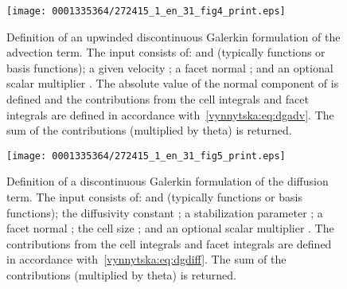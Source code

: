 \begin{figure}[!t]
\texttt{[image: 0001335364/272415\_1\_en\_31\_fig4\_print.eps]}
  \caption{Definition of an upwinded discontinuous Galerkin
    formulation of the advection term. The input consists of:
     and  (typically functions or basis
    functions); a given velocity ; a facet normal ;
    and an optional scalar multiplier . The absolute
    value of the normal component of  is defined and the
    contributions from the cell integrals and facet integrals are
    defined in accordance with~\eqref{vynnytska:eq:dgadv}. The sum
    of the contributions (multiplied by theta) is returned.}
  \label{vynnytska:fig:advection}\vspace*{10pt}
\end{figure}
%
\begin{figure}[!t]
\texttt{[image: 0001335364/272415\_1\_en\_31\_fig5\_print.eps]}
  \caption{Definition of a discontinuous Galerkin formulation of the
    diffusion term. The input consists of:  and 
    (typically functions or basis functions); the diffusivity
    constant ; a stabilization parameter ; a
    facet normal ; the cell size ; and an optional
    scalar multiplier . The contributions from the cell
    integrals and facet integrals are defined
    in accordance with~\eqref{vynnytska:eq:dgdiff}. The sum of the
    contributions (multiplied by theta) is returned.}
  \label{vynnytska:fig:diffusion}
\end{figure}

